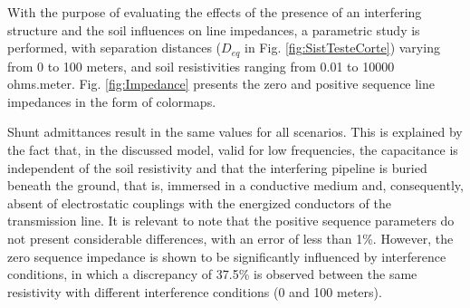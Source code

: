\documentclass[conference]{IEEEtran}
\begin{document}
	
	With the purpose of evaluating the effects of the presence of an interfering structure and the soil influences on line impedances, a parametric study is performed, with separation distances ($D_{eq}$ in Fig. \ref{fig:SistTesteCorte}) varying from 0 to 100 meters, and soil resistivities ranging from 0.01 to 10000 ohms.meter. Fig. \ref{fig:Impedance} presents the zero and positive sequence line impedances in the form of colormaps.
	
	Shunt admittances result in the same values for all scenarios. This is explained by the fact that, in the discussed model, valid for low frequencies, the capacitance is independent of the soil resistivity and that the interfering pipeline is buried beneath the ground, that is, immersed in a conductive medium and, consequently, absent of electrostatic couplings with the energized conductors of the transmission line. It is relevant to note that the positive sequence parameters do not present considerable differences, with an error of less than 1\%. However, the zero sequence impedance is shown to be significantly influenced by interference conditions, in which a discrepancy of 37.5\% is observed between the same resistivity with different interference conditions (0 and 100 meters). 
	
\end{document}
